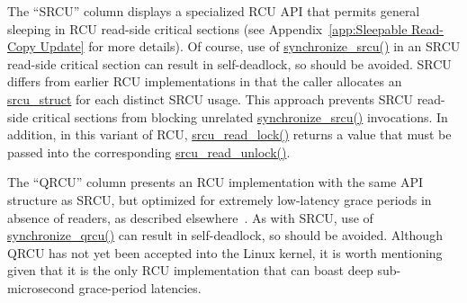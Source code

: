 \QuickQuizEnd

The ``SRCU'' column displays a specialized RCU API that permits
general sleeping in RCU read-side critical sections
(see Appendix~\ref{app:Sleepable Read-Copy Update} for more details).
Of course,
use of \url{synchronize_srcu()} in an SRCU read-side
critical section can result in
self-deadlock, so should be avoided.
SRCU differs from earlier RCU implementations in that the caller
allocates an \url{srcu_struct} for each distinct SRCU
usage.
This approach prevents SRCU read-side critical sections from blocking
unrelated \url{synchronize_srcu()} invocations.
In addition, in this variant of RCU, \url{srcu_read_lock()}
returns a value that must be passed into the corresponding
\url{srcu_read_unlock()}.

The ``QRCU'' column presents an RCU implementation with the same
API structure as SRCU, but optimized for extremely low-latency
grace periods in absence of readers, as described
elsewhere~\cite{PaulEMcKenney2007QRCUspin}.
As with SRCU, use of \url{synchronize_qrcu()} can result in
self-deadlock, so should be avoided.
Although QRCU has not yet been accepted into the Linux kernel, it
is worth mentioning given that it is the only RCU implementation
that can boast deep sub-microsecond grace-period latencies.

\QuickQuizEnd

